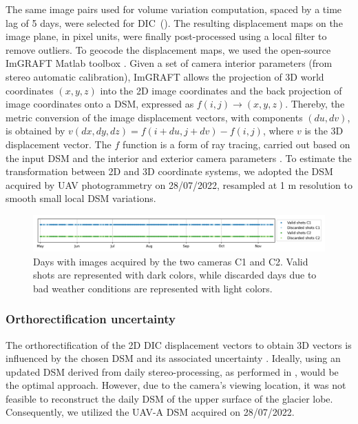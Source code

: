 The same image pairs used for volume  variation computation, spaced by a time lag of 5
days, were selected for DIC~().
The resulting displacement maps on the image plane, in pixel units, were finally
post-processed using a local filter to remove outliers.
To geocode the displacement maps, we used the open-source ImGRAFT Matlab toolbox
\citep{Messerli2015}.
Given a set of camera interior parameters (from stereo automatic calibration), ImGRAFT
allows the projection of 3D world coordinates \((x,y,z)\) into the 2D image coordinates
and the back projection of image coordinates onto a DSM, expressed as \(f(i,j) \to
(x,y,z)\). Thereby, the metric conversion of the image displacement vectors, with
components \((du,dv)\), is obtained by \(v(dx,dy,dz) = f(i+du,j+dv)-f(i,j)\), where
\(v\) is the 3D displacement vector. The \(f\) function is a form of ray tracing, carried
out based on the input DSM and the interior and exterior camera parameters
\citep{Messerli2015}.
To estimate the transformation between 2D and 3D coordinate systems,
we adopted the DSM acquired by UAV photogrammetry on 28/07/2022,
resampled at 1 m resolution to smooth small local DSM variations.

\begin{figure}[ht!]
  \centering
  \includegraphics[width=162mm]{4_discardes_shots.png}
  \caption{Days with images acquired by the two cameras C1 and C2. Valid shots are
    represented with dark colors, while discarded days due to bad weather conditions are
    represented with light colors.}
  \label{fig:4:discardes_shots}
\end{figure}

\subsubsection{Orthorectification uncertainty}
\label{sec:4:orthorectification_uncertainty}

The orthorectification of the 2D DIC displacement vectors to obtain 3D vectors is
influenced by the chosen DSM and its associated uncertainty \citep{Travelletti2012}.
Ideally, using an updated DSM derived from daily stereo-processing, as performed in
\citet{Marsy2020}, would be the optimal approach.
However, due to the camera's viewing location, it was not feasible to reconstruct the
daily DSM of the upper surface of the glacier lobe. Consequently, we utilized the UAV-A
DSM acquired on 28/07/2022.

